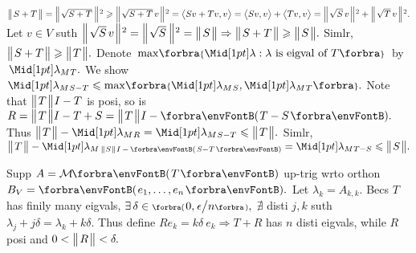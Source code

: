 $\Dvert{S+T}=\BigDvertsq{\sqrt{S+T}\;\!}\geqslant\BigDvertsq{\sqrt{S+T}\,v}=\Ang{Sv+Tv,v}=\Ang{Sv,v}+\Ang{Tv,v}=\BigDvertsq{\sqrt{S}\,v}+\BigDvertsq{\sqrt{T}\,v}.$\parSol{}
Let $v\in V$ suth $\BigDvertsq{\sqrt{S}\,v}=\BigDvertsq{\sqrt{S}\;\!}=\Dvert{S}\Rightarrow\Dvert{S+T}\geqslant\Dvert{S}.$ \;Simlr, $\Dvert{S+T}\geqslant\Dvert{T}.$\vspace{2.5pt}\parSol{}
Denote $\,\max\!\Bra{\aMid{\lambda}:\lambda\text{ is eigval of }T}\,$ by $\,\aMid{\lambda_M}{_T}.$ We show $\aMid{\lambda_M}{_{S-T}}\leqslant\max\!\Bra{\aMid{\lambda_M}{_S},\aMid{\lambda_M}{_T}}.$\parSol{}
Note that $\Dvert{T}\:\!I-T$ is posi, so is $R=\Dvert{T}I-T+S=\Dvert{T}\:\!I-\Par{T-S}.$\parSol{}
Thus $\Dvert{T}-\aMid{\lambda_M}{_R}=\aMid{\lambda_M}{_{S-T}}\leqslant\Dvert{T}.$ \;Simlr, $\Dvert{T}-\aMid{\lambda_M}{_{\,\SmallDvert{S}\:\!I\,-\,\SmallPar{S-T}}}=\aMid{\lambda_M}{_{T-S}}\leqslant\Dvert{S}.$\PfEnd
\SepLine



Supp $A=\Mt{T}$ up-trig wrto orthon $B_V=\Par{e_1,\dots,e_n}.$ Let $\lambda_k=A_{k,k}.$\parSol{}
Becs $T$ has finily many eigvals, $\exists\,\delta\in\Interval{(}{)}{0,\:\!\epsilon\big/n},$ $\nexists$ disti $j,k$ suth $\lambda_j+j\delta=\lambda_k+k\delta.$\parSol{}
Thus define $Re_k=k\delta\:\!e_k\Rightarrow T+R$ has $n$ disti eigvals, while $R$ posi and $0<\Dvert{R}<\delta.$\PfEnd
\SepLine

